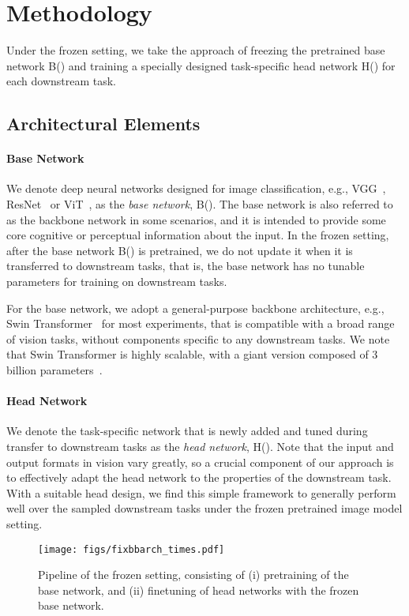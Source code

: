 \documentclass{article}
\begin{document}
\section{Methodology}
Under the frozen setting, we take the approach of freezing the pretrained base network B() and training a specially designed task-specific head network H() for each downstream task.

\subsection{Architectural Elements}

\paragraph{Base Network} We denote deep neural networks designed for image classification, e.g., VGG~\cite{simonyan2014vgg}, ResNet~\cite{he2016resnet} or ViT~\cite{dosovitskiy2020vit}, as the \emph{base network}, B(). The base network is also referred to as the backbone network in some scenarios, and it is intended to provide some core cognitive or perceptual information about the input. In the frozen setting, after the base network B() is pretrained, we do not update it when it is transferred to downstream tasks, that is, the base network has no tunable parameters for training on downstream tasks.

For the base network, we adopt a general-purpose backbone architecture, e.g., Swin Transformer~\cite{liu2021swin} for most experiments, that is compatible with a broad range of vision tasks, without components specific to any downstream tasks. We note that Swin Transformer is highly scalable, with a giant version composed of 3 billion parameters~\cite{swinv2}.

\paragraph{Head Network} We denote the task-specific network that is newly added and tuned during transfer to downstream tasks as the \emph{head network}, H(). Note that the input and output formats in vision vary greatly, so a crucial component of our approach is to effectively adapt the head network to the properties of the downstream task.
With a suitable head design, we find this simple framework to generally perform well over the sampled downstream tasks under the frozen pretrained image model setting.

\begin{figure}
    \centering
    \texttt{[image: figs/fixbbarch\_times.pdf]}
    \caption{Pipeline of the frozen setting, consisting of (i) pretraining of the base network, and (ii) finetuning of head networks with the frozen base network.}
    \label{fig:arch}
\end{figure}
\end{document}
